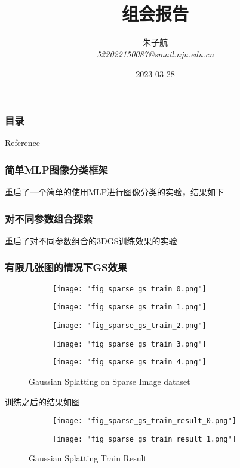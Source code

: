 \documentclass{njupre/njupre}
\title[组会报告]{ 组会报告 }
\author[朱子航]{\texorpdfstring{朱子航 \\ \smallskip \textit{522022150087@smail.nju.edu.cn}}{}}
\date[\today]{\texorpdfstring{2023-03-28}{}}
\begin{document}
\begin{frame}
    \titlepage
\end{frame}

\begin{frame}
    \frametitle{目录}
    \tableofcontents
\end{frame}

\begin{frame}[allowframebreaks]{Reference}
    
    
\end{frame}

\begin{frame}
    \frametitle{简单MLP图像分类框架}
    重启了一个简单的使用MLP进行图像分类的实验，结果如下
    
\end{frame}

\begin{frame}
    \frametitle{对不同参数组合探索}
    重启了对不同参数组合的3DGS训练效果的实验
    
\end{frame}

\begin{frame}
    \frametitle{有限几张图的情况下GS效果}
    \begin{figure}
        \begin{subfigure}{0.18\linewidth}
            \texttt{[image: "fig\_sparse\_gs\_train\_0.png"]}
        \end{subfigure}
        \begin{subfigure}{0.18\linewidth}
            \texttt{[image: "fig\_sparse\_gs\_train\_1.png"]}
        \end{subfigure}
        \begin{subfigure}{0.18\linewidth}
            \texttt{[image: "fig\_sparse\_gs\_train\_2.png"]}
        \end{subfigure}
        \begin{subfigure}{0.18\linewidth}
            \texttt{[image: "fig\_sparse\_gs\_train\_3.png"]}
        \end{subfigure}
        \begin{subfigure}{0.18\linewidth}
            \texttt{[image: "fig\_sparse\_gs\_train\_4.png"]}
        \end{subfigure}
        \caption{Gaussian Splatting on Sparse Image dataset}
    \end{figure}
    训练之后的结果如图

    \begin{figure}
        \begin{subfigure}{0.48\linewidth}
            \texttt{[image: "fig\_sparse\_gs\_train\_result\_0.png"]}
        \end{subfigure}
        \begin{subfigure}{0.48\linewidth}
            \texttt{[image: "fig\_sparse\_gs\_train\_result\_1.png"]}
        \end{subfigure}
        \caption{Gaussian Splatting Train Result}
    \end{figure}
\end{frame}
\end{document}
